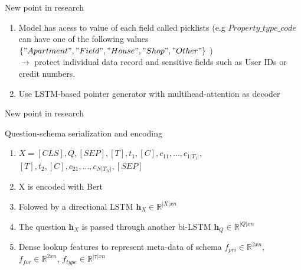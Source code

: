 \documentclass{beamer}
\begin{document}
\begin{frame}[t]{New point in research}\vspace{10pt}
\begin{enumerate}
\item  Model has acess to value of each field called picklists (e.g $Property\_type\_code$ can have one of the following values $\{"Apartment","Field","House","Shop","Other"\}$ ) \\
$\rightarrow$ protect individual data record and sensitive fields such as User IDs or credit numbers.
\pause
\item Use LSTM-based pointer generator with multihead-attention as decoder
\end{enumerate}
\end{frame} 
\begin{frame}[t]{New point in research}\vspace{10pt}
\begin{block}{Question-schema serialization and encoding}
\vspace{0.5em}
\begin{enumerate}
\item $X = [CLS],Q,[SEP],[T],t_{1},[C],c_{11},...,c_{1|T_1|},$\\$[T],t_{2},[C],c_{21},...,c_{N|T_N|},[SEP]$ \\
\pause
\item X is encoded with Bert
\pause
\item Folowed by a directional LSTM $\textbf{h}_{X}\in\mathbb{R}^{|X|xn}$
\pause 
\item The question $\textbf{h}_{X}$ is passed through another bi-LSTM $\textbf{h}_{Q}\in\mathbb{R}^{|Q|xn}$
\pause 
\item Dense lookup features to represent meta-data of schema $f_{pri}\in\mathbb{R}^{2xn}$, $f_{for}\in\mathbb{R}^{2xn}$, $f_{type}\in\mathbb{R}^{|\tau|xn}$
\vspace{0.5em}
\end{enumerate}
\end{block}
\end{frame}
\end{document}
